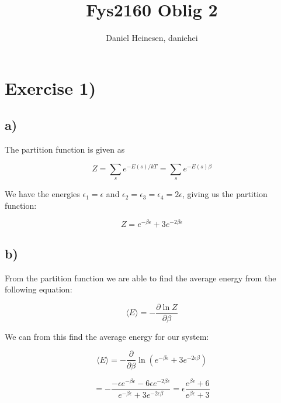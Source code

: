 \documentclass[a4paper,norsk, 10pt]{article}
\title{Fys2160 Oblig 2}
\author{Daniel Heinesen, daniehei}
\newcommand{\pd}[2]{\frac{\partial #1}{\partial #2}}
\begin{document}
\maketitle

\section{Exercise 1)}

\subsection{a)}
The partition function is given as

\begin{equation}
Z = \sum_s e^{-E(s)/kT} = \sum_s e^{-E(s)\beta}
\end{equation}\label{eq:partition}

We have the energies $\epsilon_1 = \epsilon$ and $\epsilon_2 = \epsilon_3 = \epsilon_4 = 2\epsilon$, giving us the partition function:

\begin{equation}
Z = e^{-\beta \epsilon} + 3e^{-2\beta \epsilon}
\end{equation}

\subsection{b)}
From the partition function we are able to find the average energy from the following equation:

\begin{equation}
\langle E \rangle = - \pd{\ln Z}{\beta}
\end{equation}

We can from this find the average energy for our system:

\begin{equation}
\langle E \rangle = -\pd{}{\beta} \ln \left(e^{-\beta\epsilon} +3e^{-2\epsilon\beta}\right)
\end{equation}

\begin{equation}
= -\frac{-\epsilon e^{-\beta\epsilon} - 6\epsilon e^{-2\beta\epsilon}}{e^{-\beta\epsilon} +3e^{-2\epsilon\beta}}
= \epsilon\frac{e^{\beta\epsilon} + 6}{e^{\beta\epsilon} +3}
\end{equation}
\end{document}

